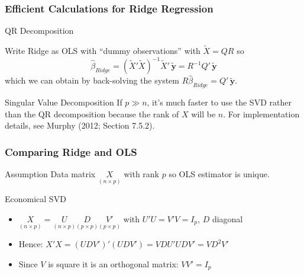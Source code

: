 \begin{frame}
  \frametitle{Efficient Calculations for Ridge Regression}
  

  \begin{block}{QR Decomposition}
    
  Write Ridge as OLS with ``dummy observations'' with $\widetilde{X} = QR$ so 
	$$\widehat{\beta}_{Ridge} = (\widetilde{X}' \widetilde{X})^{-1} \widetilde{X}'\,\widetilde{\textbf{y}} = R^{-1} Q' \,\widetilde{\textbf{y}}$$
which we can obtain by back-solving the system $R\widehat{\beta}_{Ridge} = Q'\, \widetilde{\mathbf{y}}$. 
  \end{block}

  \begin{block}{Singular Value Decomposition}
If $p \gg n$, it's much faster to use the SVD rather than the QR decomposition because the rank of $X$ will be $n$.
For implementation details, see Murphy (2012; Section 7.5.2).
  \end{block}
\end{frame}
\begin{frame}
  \frametitle{Comparing Ridge and OLS}

  \begin{block}{Assumption}
   Data matrix $\underset{(n\times p)}{X}$ with rank $p$ so OLS estimator is unique.
  \end{block}

  \begin{block}{Economical SVD}
    \begin{itemize}
      \item 
    $\underset{(n\times p)}{X} = \underset{(n\times p)}{U}\underset{(p\times p)}{D}\underset{(p\times p)}{V'}$ with $U'U = V'V = I_p$, $D$ diagonal 
  \item Hence: $X'X = (UDV')'(UDV')=VDU'UDV' = VD^2V'$
  \item Since $V$ is square it is an orthogonal matrix: $VV' = I_p$
    \end{itemize}
  \end{block}



\end{frame}
